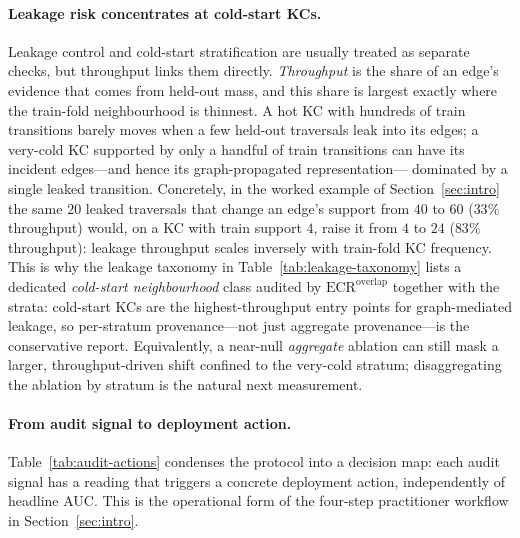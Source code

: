 \documentclass[preprint,10pt,doubleblind]{elsarticle}
\begin{document}
\paragraph{Leakage risk concentrates at cold-start KCs.}
Leakage control and cold-start stratification are usually treated as separate
checks, but throughput links them directly. \emph{Throughput}
is the share of an edge's evidence that comes from held-out mass, and this share
is largest exactly where the train-fold neighbourhood is thinnest. A hot KC with
hundreds of train transitions barely moves when a few held-out traversals leak
into its edges; a very-cold KC supported by only a handful of train transitions
can have its incident edges---and hence its graph-propagated representation---
dominated by a single leaked transition. Concretely, in the worked example of
Section~\ref{sec:intro} the same $20$ leaked traversals that change an edge's
support from $40$ to $60$ ($33\%$ throughput) would, on a KC with train support
$4$, raise it from $4$ to $24$ ($83\%$ throughput): leakage throughput scales
inversely with train-fold KC frequency. This is why the leakage taxonomy in
Table~\ref{tab:leakage-taxonomy} lists a dedicated \emph{cold-start
neighbourhood} class audited by $\mathrm{ECR}^{\mathrm{overlap}}$ together with
the strata: cold-start KCs are the highest-throughput entry points for
graph-mediated leakage, so per-stratum provenance---not just aggregate
provenance---is the conservative report. Equivalently, a near-null
\emph{aggregate} ablation can still mask a larger, throughput-driven shift
confined to the very-cold stratum; disaggregating the ablation by stratum is
the natural next measurement.

\paragraph{From audit signal to deployment action.}
Table~\ref{tab:audit-actions} condenses the protocol into a decision map: each
audit signal has a reading that triggers a concrete deployment action,
independently of headline AUC. This is the operational form of the four-step
practitioner workflow in Section~\ref{sec:intro}.
\end{document}
